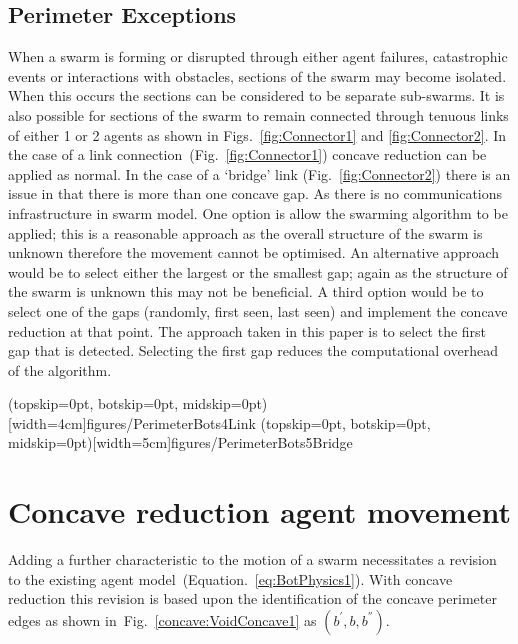 \documentclass{ieeeaccess}
\begin{document}
\subsection{Perimeter Exceptions}\label{concave:Exceptions}
When a swarm is forming or disrupted through either agent failures, catastrophic events or interactions with obstacles, sections of the swarm may become isolated. When this occurs the sections can be considered to be separate sub-swarms. It is also possible for sections of the swarm to remain connected through tenuous links of either 1 or 2 agents as shown in Figs.~\ref{fig:Connector1} and \ref{fig:Connector2}. In the case of a link connection~(Fig.~\ref{fig:Connector1}) concave reduction can be applied as normal. In the case of a `bridge' link (Fig.~\ref{fig:Connector2}) there is an issue in that there is more than one concave gap. As there is no communications infrastructure in swarm model. One option is allow the swarming algorithm to be applied; this is a reasonable approach as the overall structure of the swarm is unknown therefore the movement cannot be optimised. An alternative approach would be to select either the largest or the smallest gap; again as the structure of the swarm is unknown this may not be beneficial. A third option would be to select one of the gaps (randomly, first seen, last seen) and implement the concave reduction at that point. The approach taken in this paper is to select the first gap that is detected. Selecting the first gap reduces the computational overhead of the algorithm.

\Figure[t!](topskip=0pt, botskip=0pt, midskip=0pt)[width=4cm]{figures/PerimeterBots4}{Link\label{fig:Connector1}}
\Figure[t!](topskip=0pt, botskip=0pt, midskip=0pt)[width=5cm]{figures/PerimeterBots5}{Bridge\label{fig:Connector2}}

\section{Concave reduction agent movement}\label{concave:AgentMovement}
Adding a further characteristic to the motion of a swarm necessitates a revision to the existing agent model~(Equation.~\ref{eq:BotPhysics1}). With concave reduction this revision is based upon the identification of the concave perimeter edges as shown in~Fig.~\ref{concave:VoidConcave1} as $(b^{'},b,b^{''})$. 
\end{document}
